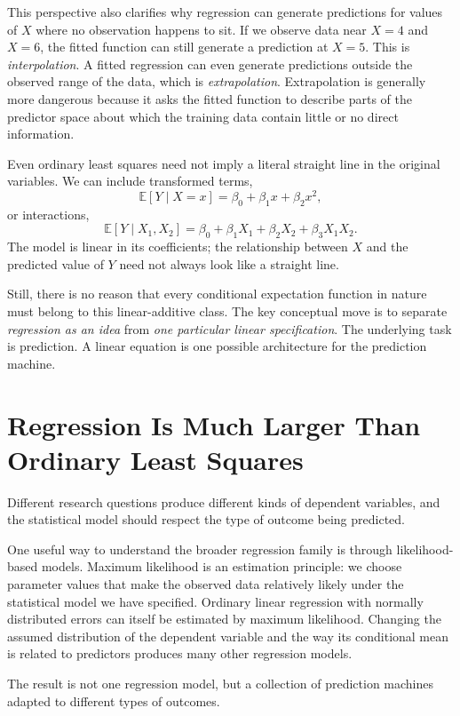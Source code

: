 \documentclass[11pt]{report}
\newcommand{\E}{\mathbb{E}}
\begin{document}
This perspective also clarifies why regression can generate predictions for values of \(X\) where no observation happens to sit. If we observe data near \(X=4\) and \(X=6\), the fitted function can still generate a prediction at \(X=5\). This is \emph{interpolation}. A fitted regression can even generate predictions outside the observed range of the data, which is \emph{extrapolation}. Extrapolation is generally more dangerous because it asks the fitted function to describe parts of the predictor space about which the training data contain little or no direct information.

Even ordinary least squares need not imply a literal straight line in the original variables. We can include transformed terms,
\[
\E[Y\mid X=x]
=
\beta_0+\beta_1x+\beta_2x^2,
\]
or interactions,
\[
\E[Y\mid X_1,X_2]
=
\beta_0+\beta_1X_1+\beta_2X_2+\beta_3X_1X_2.
\]
The model is linear in its coefficients; the relationship between \(X\) and the predicted value of \(Y\) need not always look like a straight line.

Still, there is no reason that every conditional expectation function in nature must belong to this linear-additive class. The key conceptual move is to separate \emph{regression as an idea} from \emph{one particular linear specification}. The underlying task is prediction. A linear equation is one possible architecture for the prediction machine.

\section{Regression Is Much Larger Than Ordinary Least Squares}

Different research questions produce different kinds of dependent variables, and the statistical model should respect the type of outcome being predicted.

One useful way to understand the broader regression family is through likelihood-based models. Maximum likelihood is an estimation principle: we choose parameter values that make the observed data relatively likely under the statistical model we have specified. Ordinary linear regression with normally distributed errors can itself be estimated by maximum likelihood. Changing the assumed distribution of the dependent variable and the way its conditional mean is related to predictors produces many other regression models.

The result is not one regression model, but a collection of prediction machines adapted to different types of outcomes.
\end{document}
